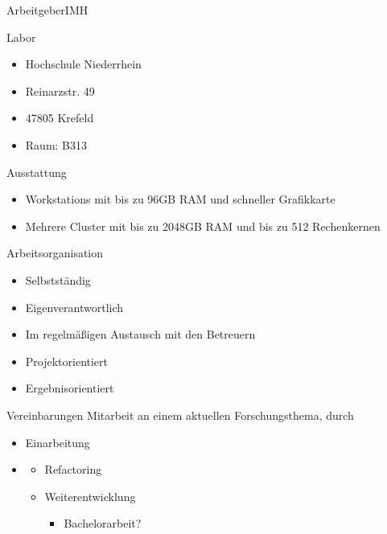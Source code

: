 \documentclass{beamer}           %
\begin{document}
\begin{frame}{Arbeitgeber}{IMH}
	\begin{block}{Labor}

		\begin{itemize}
			\item Hochschule Niederrhein
			
			\item Reinarzstr. 49
			
			\item 47805 Krefeld
			
			\item Raum: B313		
		\end{itemize}
	\end{block}
	\pause
	\begin{block}{Ausstattung}
		
		\begin{itemize}
			\item<2-> Workstations mit bis zu \alert{96GB RAM} und schneller Grafikkarte
			
			\item<3-> Mehrere Cluster mit bis zu \alert{2048GB RAM} und bis zu \alert{512 Rechenkernen}
			
		\end{itemize}
	\end{block}
\end{frame}


\begin{frame}{Arbeitsorganisation}
	\begin{itemize}
		\item Selbstständig
		\pause
		\item Eigenverantwortlich
		\pause
		\item Im regelmäßigen Austausch mit den Betreuern
		\pause
		\item Projektorientiert
		\pause
		\item Ergebnisorientiert
	\end{itemize}
\end{frame}

\begin{frame}{Vereinbarungen}
	Mitarbeit an einem aktuellen Forschungsthema, durch
	\begin{itemize}
		\item Einarbeitung
		\pause
		\item {}
		\pause
		\begin{itemize}
			\item Refactoring
			\item Weiterentwicklung
			\begin{itemize}
				\item \alert{Bachelorarbeit?}
			\end{itemize}
		\end{itemize}
	\end{itemize}
\end{frame}
\end{document}
